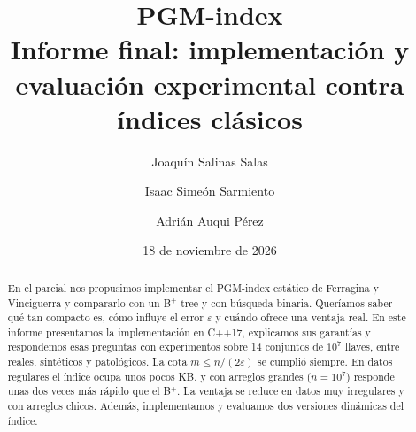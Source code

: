 \documentclass[11pt,a4paper]{article}
\title{PGM-index\\
\large Informe final: implementación y evaluación experimental contra índices clásicos}
\author{Joaquín Salinas Salas \and Isaac Simeón Sarmiento \and Adrián Auqui Pérez}
\date{18 de noviembre de 2026}
\begin{document}
\maketitle

\begin{abstract}
En el parcial nos propusimos implementar el PGM-index estático de Ferragina y Vinciguerra y
compararlo con un B$^+$ tree y con búsqueda binaria. Queríamos saber qué tan compacto es, cómo
influye el error $\varepsilon$ y cuándo ofrece una ventaja real. En este informe presentamos la
implementación en C++17, explicamos sus garantías y respondemos esas preguntas con experimentos
sobre 14 conjuntos de $10^7$ llaves, entre reales, sintéticos y patológicos. La cota
$m\le n/(2\varepsilon)$ se cumplió siempre. En datos regulares el índice ocupa unos pocos KB, y
con arreglos grandes ($n=10^7$) responde unas dos veces más rápido que el B$^+$. La ventaja se
reduce en datos muy irregulares y con arreglos chicos. Además, implementamos y
evaluamos dos versiones dinámicas del índice.
\end{abstract}










\end{document}
